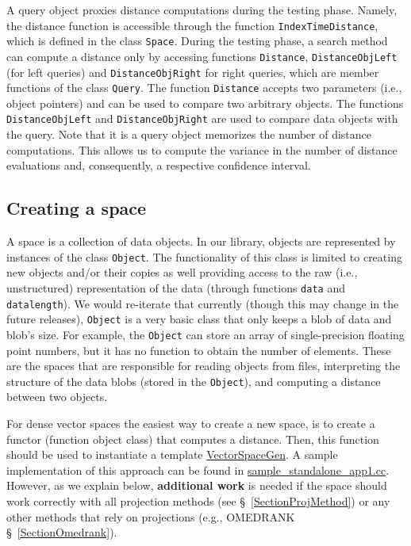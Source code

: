 \documentclass[runningheads,a4paper]{llncs}
\newcommand{\replocfile}{https://github.com/searchivarius/NonMetricSpaceLib/blob/develop/}
\newcommand{\ttt}[1]{\texttt{#1}}
\begin{document}
A query object proxies distance computations during the testing phase.
Namely, the distance function is accessible through the function
\ttt{IndexTimeDistance}, which is defined in the class \ttt{Space}.
During the testing phase, a search method can compute a distance
only by accessing functions \ttt{Distance}, 
\ttt{DistanceObjLeft} (for left queries) and 
\ttt{DistanceObjRight} for right queries,
which are member functions of the class \ttt{Query}.
The function \ttt{Distance} accepts two parameters (i.e., object pointers) and 
can be used to compare two arbitrary objects.
The functions \ttt{DistanceObjLeft} and \ttt{DistanceObjRight} are used 
to compare data objects with the query.
Note that it is a query object  memorizes the number of distance computations.
This allows us to compute the variance in the number of distance evaluations
and, consequently, a respective confidence interval.



\subsection{Creating a space}\label{SectionCreateSpace}
A space is a collection of data objects.
In our library, objects are represented by instances
of the class \ttt{Object}.
The functionality of this class is limited to
creating new objects and/or their copies as well providing
access to the raw (i.e., unstructured) representation of the data
(through functions \ttt{data} and \ttt{datalength}).
We would re-iterate that currently (though this may change in the future releases),
\ttt{Object} is a very basic class that only keeps a blob of data and blob's size.
For example, the \ttt{Object} can store an array of single-precision floating point
numbers, but it has no function to obtain the number of elements.
These are the spaces that are responsible for reading objects from files,
interpreting the structure of the data blobs (stored in the \ttt{Object}), 
and computing a distance between two objects.

For dense vector spaces the easiest way to create a new space,
is to create a functor (function object class) that computes a distance.
Then, this function should be used to instantiate a template
\href{\replocfile similarity_search/include/space/space_vector_gen.h}{VectorSpaceGen}.
A sample implementation of this approach can be found
in \href{\replocfile sample_standalone_app/sample_standalone_app1.cc#L114}{sample\_standalone\_app1.cc}.
However, as we explain below, \textbf{additional work} is needed if the space should work correctly with all projection methods 
(see \S~\ref{SectionProjMethod}) or any other methods that rely on projections (e.g., OMEDRANK \S~\ref{SectionOmedrank}).
\end{document}
